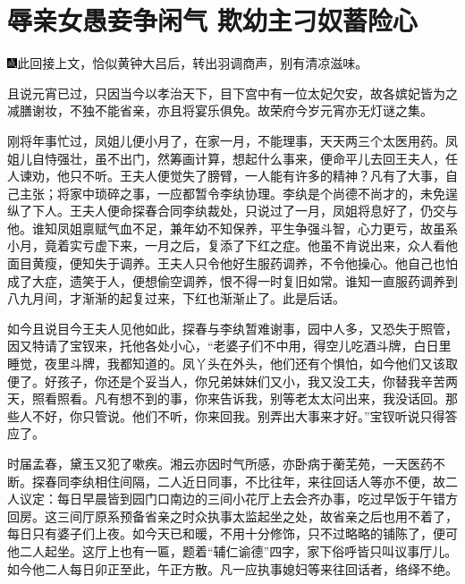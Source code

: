 

\chapter{辱亲女愚妾争闲气 欺幼主刁奴蓄险心}

{\includegraphics[width=3mm]{../Images/00005}此回接上文，恰似黄钟大吕后，转出羽调商声，别有清凉滋味。}

且说元宵已过，只因当今以孝治天下，目下宫中有一位太妃欠安，故各嫔妃皆为之减膳谢妆，不独不能省亲，亦且将宴乐俱免。故荣府今岁元宵亦无灯谜之集。

刚将年事忙过，凤姐儿便小月了，在家一月，不能理事，天天两三个太医用药。凤姐儿自恃强壮，虽不出门，然筹画计算，想起什么事来，便命平儿去回王夫人，任人谏劝，他只不听。王夫人便觉失了膀臂，一人能有许多的精神？凡有了大事，自己主张；将家中琐碎之事，一应都暂令李纨协理。李纨是个尚德不尚才的，未免逞纵了下人。王夫人便命探春合同李纨裁处，只说过了一月，凤姐将息好了，仍交与他。谁知凤姐禀赋气血不足，兼年幼不知保养，平生争强斗智，心力更亏，故虽系小月，竟着实亏虚下来，一月之后，复添了下红之症。他虽不肯说出来，众人看他面目黄瘦，便知失于调养。王夫人只令他好生服药调养，不令他操心。他自己也怕成了大症，遗笑于人，便想偷空调养，恨不得一时复旧如常。谁知一直服药调养到八九月间，才渐渐的起复过来，下红也渐渐止了。此是后话。

如今且说目今王夫人见他如此，探春与李纨暂难谢事，园中人多，又恐失于照管，因又特请了宝钗来，托他各处小心，``老婆子们不中用，得空儿吃酒斗牌，白日里睡觉，夜里斗牌，我都知道的。凤丫头在外头，他们还有个惧怕，如今他们又该取便了。好孩子，你还是个妥当人，你兄弟妹妹们又小，我又没工夫，你替我辛苦两天，照看照看。凡有想不到的事，你来告诉我，别等老太太问出来，我没话回。那些人不好，你只管说。他们不听，你来回我。别弄出大事来才好。''宝钗听说只得答应了。

时届孟春，黛玉又犯了嗽疾。湘云亦因时气所感，亦卧病于蘅芜苑，一天医药不断。探春同李纨相住间隔，二人近日同事，不比往年，来往回话人等亦不便，故二人议定：每日早晨皆到园门口南边的三间小花厅上去会齐办事，吃过早饭于午错方回房。这三间厅原系预备省亲之时众执事太监起坐之处，故省亲之后也用不着了，每日只有婆子们上夜。如今天已和暖，不用十分修饰，只不过略略的铺陈了，便可他二人起坐。这厅上也有一匾，题着``辅仁谕德''四字，家下俗呼皆只叫议事厅儿。如今他二人每日卯正至此，午正方散。凡一应执事媳妇等来往回话者，络绎不绝。

